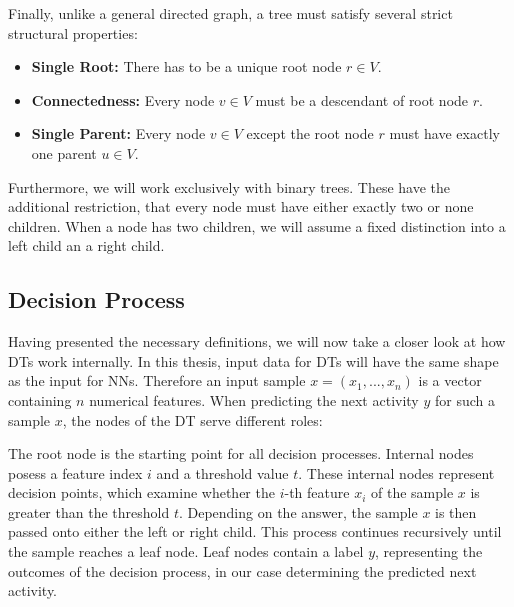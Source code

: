 Finally, unlike a general directed graph, a tree must satisfy several strict structural properties:
\begin{itemize}
  \item \textbf{Single Root:} There has to be a unique root node $r \in V$.
  \item \textbf{Connectedness:} Every node $v \in V$ must be a descendant of root node $r$.
  \item \textbf{Single Parent:} Every node $v \in V$ except the root node $r$ must have exactly one parent $u \in V$.
\end{itemize}
Furthermore, we will work exclusively with binary trees.
These have the additional restriction, that every node must have either exactly two or none children.
When a node has two children, we will assume a fixed distinction into a left child an a right child.

\subsection{Decision Process}
Having presented the necessary definitions,
we will now take a closer look at how DTs work internally.
In this thesis, input data for DTs will have the same shape as the input for NNs.
Therefore an input sample $x = (x_1, ..., x_n)$ is a vector containing $n$ numerical features.
When predicting the next activity $y$ for such a sample $x$, the nodes of the DT serve different roles:

The root node is the starting point for all decision processes.
Internal nodes posess a feature index $i$ and a threshold value $t$.
These internal nodes represent decision points, which examine whether the $i$-th feature $x_i$ of the sample $x$
is greater than the threshold $t$.
Depending on the answer, the sample $x$ is then passed onto either the left or right child.
This process continues recursively until the sample reaches a leaf node.
Leaf nodes contain a label $y$, representing the outcomes of the decision process,
in our case determining the predicted next activity.

